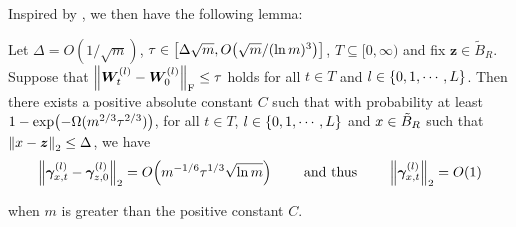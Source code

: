 
Inspired by \citet[Lemma 8.7]{allen-zhu2019_ConvergenceTheory}, we then have the following lemma:
\begin{lemma}
  \label{lem:backward perturbation}
  Let $\Delta=O(1/\sqrt{m})$, $\tau\in\zk{\Delta\sqrt{m},O\xkm{{\sqrt{m}}/{(\ln m)^3}}}$, $T\subseteq [0,\infty)$ and fix ${\bm{z}} \in\tilde{B}_R$.
  Suppose that $\norm{\bm{W}^{(l)}_t - \bm{W}^{(l)}_0 }_{\mathrm{F}}\leq\tau$ holds for all $t\in T$ and $l\in\left\{0,1,\cdots,L\right\}$.
  Then there exists a positive absolute constant $C$ such that with probability at least $1-\exp\xkm{-\Omega(m^{2/3}\tau^{2/3})}$, for all $t\in T$, $l\in\left\{0,1,\cdots,L\right\}$ and $x \in\tilde{B}_R$ such that $\norm{x-\bm{z}}_2 \leq \Delta$, we have
  \begin{align*}
    \norm{{\bm{\gamma}}^{(l)}_{\x,t} - {\bm{\gamma}}^{(l)}_{\z,0}}_2
    = O\xkm{m^{-1/6} \tau^{1/3}\sqrt{\ln m}}\qquad~\text{and thus}\qquad~ \norm{{\bm{\gamma}}^{(l)}_{\x,t}}_2=O(1)
  \end{align*}
\end{lemma}
when $m$ is greater than the positive constant $C$.
